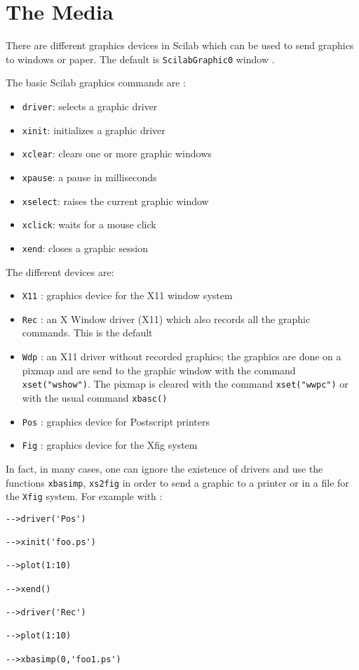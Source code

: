  
\section{The Media}
There are different graphics devices in Scilab which can be used to send
graphics to windows or paper. The default is \verb+ScilabGraphic0+ window .

The basic Scilab graphics commands are :
%
\begin{itemize}
	\item \verb+driver+: selects a graphic driver
	\item \verb+xinit+: initializes a graphic driver
	\item \verb+xclear+: clears one or more graphic windows
	\item \verb+xpause+: a pause in milliseconds
	\item \verb+xselect+: raises the current graphic window
	\item \verb+xclick+: waits for a mouse click
	\item \verb+xend+: closes a graphic session
\end{itemize}
%

\noindent The different devices are:

%
\begin{itemize}
	\item \verb+X11+	: graphics device for the X11 window system 
	\item \verb+Rec+	: an X Window driver (X11) which also records all the graphic commands. This is the default
	\item \verb+Wdp+	: an X11 driver without recorded graphics; the graphics are done on a pixmap and are send to the graphic window with the
command  {\tt xset("wshow")}. The pixmap is cleared with the command
{\tt xset("wwpc")} or with the usual command {\tt xbasc()}
	\item \verb+Pos+	: graphics device for Postscript printers 
	\item \verb+Fig+	: graphics device for the Xfig system
\end{itemize}
%

In fact, in many cases, one can ignore the existence of drivers and use the
functions \verb+xbasimp+, \verb+xs2fig+ in order to send a graphic 
to a printer or in a file for the \verb+Xfig+ system. For example with :
\begin{verbatim}
-->driver('Pos')
 
-->xinit('foo.ps')
 
-->plot(1:10)
 
-->xend()
 
-->driver('Rec')
 
-->plot(1:10)
 
-->xbasimp(0,'foo1.ps')

\end{verbatim}

